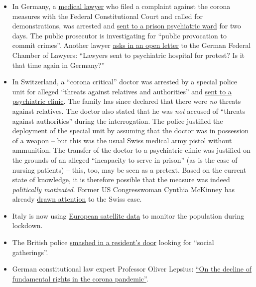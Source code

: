 \begin{itemize}
\tightlist
\item
  In Germany, a \href{http://beatebahner.de/}{medical lawyer} who filed
  a complaint against the corona measures with the Federal
  Constitutional Court and called for demonstrations, was arrested and
  \href{https://www.rnz.de/nachrichten/heidelberg_artikel,-nach-aufruf-zu-corona-demo-heidelberger-anwaeltin-in-psychiatrischer-einrichtung-update-_arid,508747.html}{sent
  to a prison psychiatric ward} for two days. The public prosecutor is
  investigating for ``public provocation to commit crimes''. Another
  lawyer
  \href{https://archive.is/20200415172607/https://www.nachrichtenspiegel.de/2020/04/14/brief-an-die-bundesrechtsanwaltskammer-in-causa-bahmer/}{asks
  in an open letter} to the German Federal Chamber of Lawyers: ``Lawyers
  sent to psychiatric hospital for protest? Is it that time again in
  Germany?''
\item
  In Switzerland, a ``corona critical'' doctor was arrested by a special
  police unit for alleged ``threats against relatives and authorities''
  and
  \href{https://www.srf.ch/news/regional/aargau-solothurn/festnahme-von-corona-kritiker-verschwoerung-oder-normale-intervention-der-aargauer-behoerden}{sent
  to a psychiatric clinic}. The family has since declared that there
  were \emph{no} threats against relatives. The doctor also stated that
  he was \emph{not} accused of ``threats against authorities'' during
  the interrogation. The police justified the deployment of the special
  unit by assuming that the doctor was in possession of a weapon -- but
  this was the usual Swiss medical army pistol without ammunition. The
  transfer of the doctor to a psychiatric clinic was justified on the
  grounds of an alleged ``incapacity to serve in prison'' (as is the
  case of nursing patients) -- this, too, may be seen as a pretext.
  Based on the current state of knowledge, it is therefore possible that
  the measure was indeed \emph{politically motivated}. Former US
  Congresswoman Cynthia McKinney has already
  \href{https://twitter.com/cynthiamckinney/status/1250075810838581248}{drawn
  attention} to the Swiss case.
\item
  Italy is now using
  \href{https://www.ansa.it/english/news/2020/04/06/coronavirus-italy-activates-satellite-to-monitor-nation-3_f2ffb30c-d550-42f5-82fc-ec1f82c5c625.html}{European
  satellite data} to monitor the population during lockdown.
\item
  The British police
  \href{https://twitter.com/BanTheBBC/status/1249598512427347969}{smashed
  in a resident's door} looking for ``social gatherings''.
\item
  German constitutional law expert Professor Oliver Lepsius:
  \href{https://verfassungsblog.de/vom-niedergang-grundrechtlicher-denkkategorien-in-der-corona-pandemie/}{``On
  the decline of fundamental rights in the corona pandemic''}.
\end{itemize}

